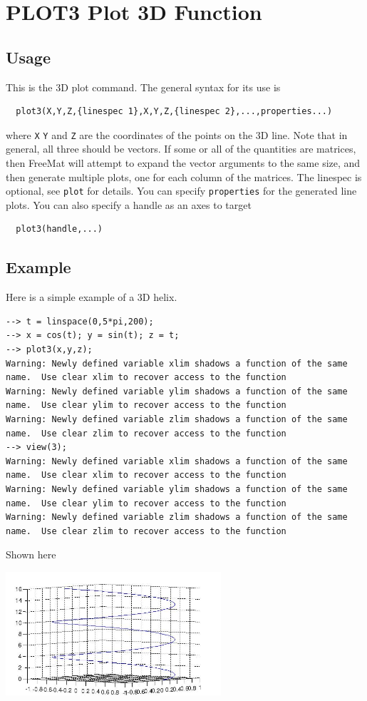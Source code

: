 \section{PLOT3 Plot 3D Function}

\subsection{Usage}

This is the 3D plot command.  The general syntax for its use is
\begin{verbatim}
  plot3(X,Y,Z,{linespec 1},X,Y,Z,{linespec 2},...,properties...)
\end{verbatim}
where \verb|X| \verb|Y| and \verb|Z| are the coordinates of the points on the
3D line.  Note that in general, all three should be vectors.  If
some or all of the quantities are matrices, then FreeMat will attempt
to expand the vector arguments to the same size, and then generate
multiple plots, one for each column of the matrices.  The linespec
is optional, see \verb|plot| for details.  You can specify \verb|properties|
for the generated line plots.  You can also specify a handle as an
axes to target
\begin{verbatim}
  plot3(handle,...)
\end{verbatim}
\subsection{Example}

Here is a simple example of a 3D helix.
\begin{verbatim}
--> t = linspace(0,5*pi,200);
--> x = cos(t); y = sin(t); z = t;
--> plot3(x,y,z);
Warning: Newly defined variable xlim shadows a function of the same name.  Use clear xlim to recover access to the function
Warning: Newly defined variable ylim shadows a function of the same name.  Use clear ylim to recover access to the function
Warning: Newly defined variable zlim shadows a function of the same name.  Use clear zlim to recover access to the function
--> view(3);
Warning: Newly defined variable xlim shadows a function of the same name.  Use clear xlim to recover access to the function
Warning: Newly defined variable ylim shadows a function of the same name.  Use clear ylim to recover access to the function
Warning: Newly defined variable zlim shadows a function of the same name.  Use clear zlim to recover access to the function
\end{verbatim}
Shown here


\centerline{\includegraphics[width=8cm]{plt3}}

